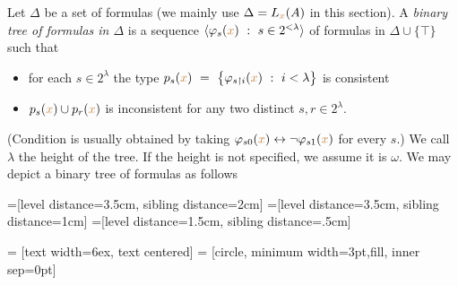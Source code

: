 \begin{definition}\label{def_tree_formulas}
Let $\Delta$ be a set of formulas (we mainly use $\Delta=L_{\color{brown} x}(A)$ in this section).
A \emph{binary tree of formulas in $\Delta$\/} is a sequence $\<\phi_s({\mr x})\ :\ s\in2^{<\lambda}\>$ of formulas in $\Delta\cup\{\top\}$ such that\nobreak
\begin{itemize}
\item[1.] for each $s\in 2^\lambda$ the type $p_s({\mr x})\ =\ \big\{\phi_{s\restriction i}({\mr x})\ :\ i<\lambda\big\}$ is consistent
\item[2.] $p_s({\color{brown} x})\cup p_r({\color{brown} x})$ is inconsistent for any two distinct $s,r\in 2^\lambda$.
\end{itemize}
(Condition  is usually obtained by taking $\varphi_{s0}({\color{brown} x})\leftrightarrow\neg\varphi_{s1}({\color{brown} x})$ for every $s$.)
We call $\lambda$ the height of the tree.
If the height is not specified, we assume it is $\omega$.
We may depict a binary tree of formulas as follows
\baselineskip

=[level distance=3.5cm, sibling distance=2cm]
=[level distance=3.5cm, sibling distance=1cm]
=[level distance=1.5cm, sibling distance=.5cm]

 = [text width=6ex, text centered]
 = [circle, minimum width=3pt,fill, inner sep=0pt]

\def\leaf{...}


\end{definition}
